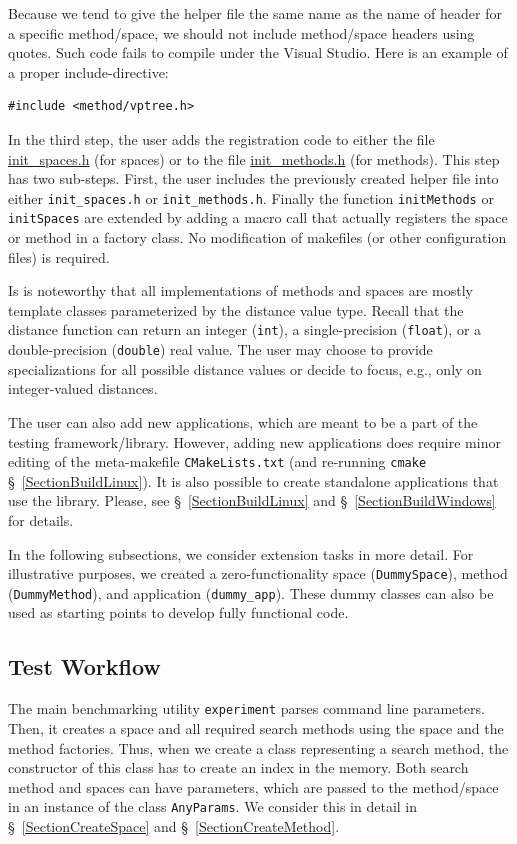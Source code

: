 \documentclass[runningheads,a4paper]{llncs}
\newcommand{\replocfile}{https://github.com/searchivarius/NonMetricSpaceLib/blob/develop/}
\newcommand{\ttt}[1]{\texttt{#1}}
\begin{document}
Because we tend to give the helper file the same name
as the name of header for a specific method/space,
we should not include method/space headers using quotes.
Such code fails to compile under the Visual Studio. 
Here is an example of a proper include-directive:
\begin{verbatim}
#include <method/vptree.h>
\end{verbatim}


In the third step, the user adds 
the registration code to either the file 
\href{\replocfile similarity_search/include/factory/init_spaces.h}{init\_spaces.h} (for spaces)
or to the file
\href{\replocfile similarity_search/include/factory/init_methods.h}{init\_methods.h} (for methods).
This step has two sub-steps. 
First, the user includes the previously created helper file into either
\ttt{init\_spaces.h} or \ttt{init\_methods.h}.
Finally the function \ttt{initMethods} or \ttt{initSpaces} are extended
by adding a macro call that actually registers the space or method in a factory class.
No modification of makefiles (or other configuration files) is required.

Is is noteworthy that all implementations of methods and spaces
are mostly template classes parameterized by the distance value type.
Recall that the distance function can return an integer (\ttt{int}), 
a single-precision (\ttt{float}), or a double-precision (\ttt{double}) real value.
The user may choose to provide specializations for all possible
distance values or decide to focus, e.g., only on integer-valued distances.

The user can also add new applications, which are meant to be 
a part of the testing framework/library.
However, adding new applications does require minor editing of the meta-makefile \ttt{CMakeLists.txt} 
(and re-running \ttt{cmake} \S~\ref{SectionBuildLinux}).
It is also possible to create standalone applications that use the library.
Please, see \S~\ref{SectionBuildLinux} and \S~\ref{SectionBuildWindows} for details.

In the following subsections, 
we consider extension tasks in more detail.
For illustrative purposes,
we created a zero-functionality space (\ttt{DummySpace}), 
method (\ttt{DummyMethod}), and application (\ttt{dummy\_app}).
These dummy classes can also be used as starting points to develop fully functional code.

\subsection{Test Workflow}\label{SectionWorkflow}
The main benchmarking utility \ttt{experiment} parses command line parameters. 
Then, it creates a space and all required search methods using
the space and the method factories.
Thus, when we create a class representing a search method,
the constructor of this class has to create an index in the memory.
Both search method and spaces can have parameters,
which are passed to the method/space in an instance
of the class \ttt{AnyParams}.
We consider this in detail in \S~\ref{SectionCreateSpace} and \S~\ref{SectionCreateMethod}.
\end{document}
